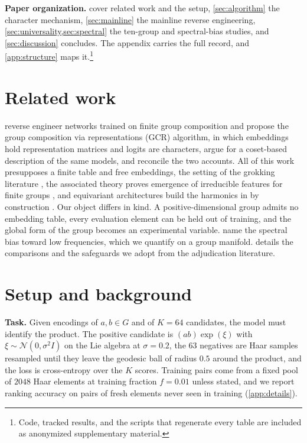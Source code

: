 \documentclass{article}
\begin{document}
\textbf{Paper organization.}  cover related
work and the setup, \cref{sec:algorithm} the character mechanism,
\cref{sec:mainline} the mainline reverse engineering,
\cref{sec:universality,sec:spectral} the ten-group and spectral-bias
studies, and \cref{sec:discussion} concludes. The appendix carries the
full record, and \cref{app:structure} maps it.\footnote{Code, tracked results, and the scripts that regenerate every
table are included as anonymized supplementary material.}

\section{Related work}
\label{sec:related}

\citet{chughtai2023} reverse engineer networks trained on finite group
composition and propose the group composition via representations (GCR)
algorithm, in which embeddings hold representation matrices and logits
are characters, \citet{stander2024} argue for a coset-based description
of the same models, and \citet{wu2024} reconcile the two accounts. All
of this work presupposes a finite table and free embeddings, the setting
of the grokking literature \cite{power2022, nanda2023, gromov2023,
zhong2023}, the associated theory proves emergence of irreducible
features for finite groups \cite{morwani2024, marchetti2024}, and
equivariant architectures build the harmonics in by construction
\cite{cohen2016, geiger2022}. Our object differs in kind. A positive-dimensional group admits no
embedding table, every evaluation element can be held out of training,
and the global form of the group becomes an experimental variable.
\citet{rahaman2019} name the spectral bias toward low frequencies, which
we quantify on a group manifold.  details the
comparisons and the safeguards we adopt from the adjudication
literature.

\section{Setup and background}
\label{sec:setup}

\textbf{Task.} Given encodings of $a, b \in G$ and of $K = 64$
candidates, the model must identify the product. The positive candidate
is $(ab)\exp(\xi)$ with $\xi \sim \mathcal N(0, \sigma^2 I)$ on the Lie
algebra at $\sigma = 0.2$, the $63$ negatives are Haar samples resampled
until they leave the geodesic ball of radius $0.5$ around the product,
and the loss is cross-entropy over the $K$ scores. Training pairs come from a fixed pool of $2048$
Haar elements at training fraction $f = 0.01$ unless stated, and we
report ranking accuracy on pairs of fresh elements never seen in
training (\cref{app:details}).
\end{document}
